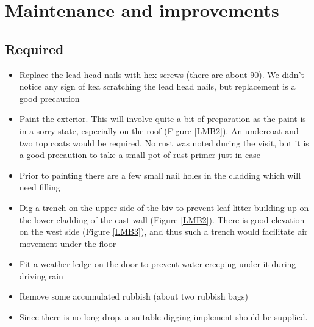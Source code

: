 \documentclass[12pt]{article} %
\begin{document}
\section{Maintenance and improvements}

\subsection{Required}

\begin{itemize}
 \item Replace the lead-head nails with hex-screws (there are about 90).  We didn't notice any sign of kea scratching the lead head nails, but replacement is a good precaution
 \item Paint the exterior.  This will involve quite a bit of preparation as the paint is in a sorry state, especially on the roof (Figure \ref{LMB2}).  An undercoat and two top coats would be required.  No rust was noted during the visit, but it is a good precaution to take a small pot of rust primer just in case
 \item Prior to painting there are a few small nail holes in the cladding which will need filling
 \item Dig a trench on the upper side of the biv to prevent leaf-litter building up on the lower cladding of the east wall (Figure \ref{LMB2}).  There is good elevation on the west side (Figure \ref{LMB3}), and thus such a trench would facilitate air movement under the floor
 \item Fit a weather ledge on the door to prevent water creeping under it during driving rain
 \item Remove some accumulated rubbish (about two rubbish bags)
 \item Since there is no long-drop, a suitable digging implement should be supplied.
\end{itemize}
 
\end{document}
